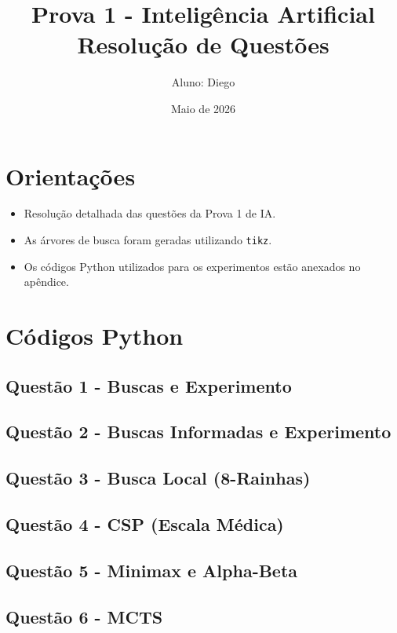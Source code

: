 \documentclass[12pt,a4paper]{article}
\title{Prova 1 - Inteligência Artificial\\Resolução de Questões}
\author{Aluno: Diego}
\date{Maio de 2026}
\begin{document}
\maketitle
\tableofcontents
\newpage

\section*{Orientações}
\begin{itemize}[leftmargin=1.5em]
  \item Resolução detalhada das questões da Prova 1 de IA.
  \item As árvores de busca foram geradas utilizando \texttt{tikz}.
  \item Os códigos Python utilizados para os experimentos estão anexados no apêndice.
\end{itemize}








\appendix
\section{Códigos Python}

\subsection{Questão 1 - Buscas e Experimento}
%
%

\subsection{Questão 2 - Buscas Informadas e Experimento}
%
%

\subsection{Questão 3 - Busca Local (8-Rainhas)}


\subsection{Questão 4 - CSP (Escala Médica)}


\subsection{Questão 5 - Minimax e Alpha-Beta}


\subsection{Questão 6 - MCTS}

\end{document}
